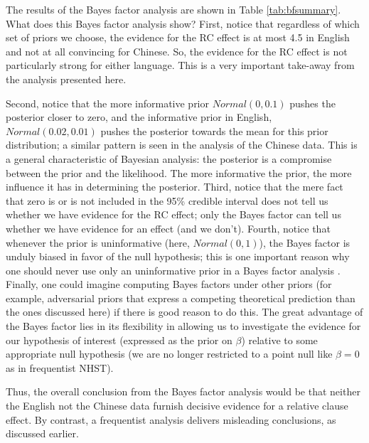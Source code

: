 \documentclass{ar-1col}\usepackage[]{graphicx}\usepackage[]{color}
\begin{document}
The results of the Bayes factor analysis are shown in Table \ref{tab:bfsummary}.
What does this Bayes factor analysis show? First, notice that regardless of which set of priors we choose, the evidence for the RC effect is at most 4.5 in English and not at all convincing for Chinese. So, the evidence for the RC effect is not particularly strong for either language. This is a very important take-away from the analysis presented here. 


Second, notice that the more informative prior $\mathit{Normal}(0,0.1)$ pushes the posterior closer to zero, and the informative prior in English, $\mathit{Normal}(0.02,0.01)$ pushes the posterior towards the mean for this prior distribution; a similar pattern is seen in the analysis of the Chinese data. This is a general characteristic of Bayesian analysis: the posterior is a compromise between the prior and the likelihood. The more informative the prior, the more influence it has in determining the posterior. Third, notice that the mere fact that zero is or is not included in the 95\% credible interval does not tell us whether we have evidence for the RC effect; only the Bayes factor can tell us whether we have evidence for an effect (and we don't). Fourth, notice that whenever the prior is uninformative (here, $\mathit{Normal}(0,1)$), the Bayes factor is unduly biased in favor of the null hypothesis; this is one important reason why one should never use only an uninformative prior in a Bayes factor analysis \citep[cf. the misleading advice in articles like][to compute Bayes factors using so-called `default' priors that are uninformative]{wagenmakers2018bayesian2}. Finally, one could imagine computing Bayes factors under other priors (for example, adversarial priors that express a competing theoretical prediction than the ones discussed here) if there is good reason to do this. The great advantage of the Bayes factor lies in its flexibility in allowing us to investigate the evidence for our hypothesis of interest (expressed as the prior on $\beta$) relative to some appropriate null hypothesis (we are no longer restricted to a point null like $\beta=0$ as in  frequentist NHST).


Thus, the overall conclusion from the Bayes factor analysis would be that neither the English not the Chinese data furnish decisive evidence for a relative clause effect. By contrast, a frequentist analysis delivers misleading conclusions, as discussed earlier.
\end{document}
